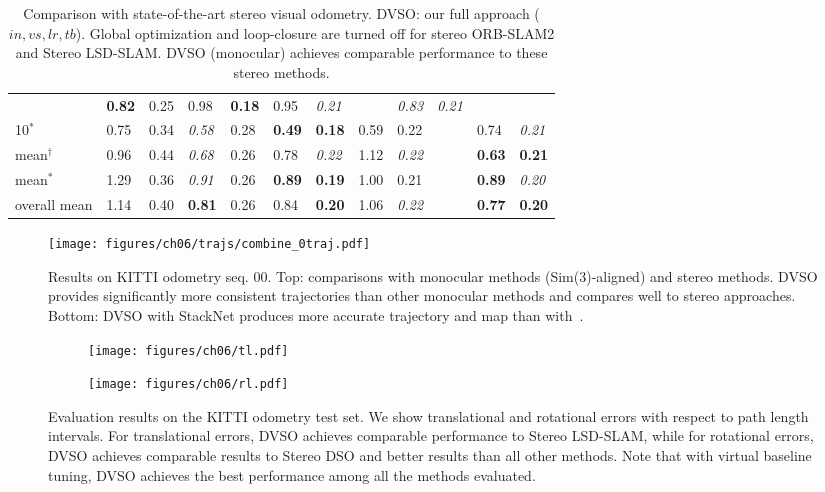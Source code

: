\documentclass[runningheads]{llncs}
\begin{document}
\begin{table}[tb]
\begin{tabular}{C{1.5cm}|C{0.9cm}C{0.9cm}|C{0.95cm}C{0.95cm}|C{0.75cm}C{0.75cm}|C{0.75cm}C{0.75cm}|C{2pt}|C{0.8cm}C{0.8cm}}
		& \textbf{0.82} & 0.25 & 0.98 & \textbf{0.18} 
		&0.95&\textit{0.21}&&\textit{0.83} & 
		\textit{0.21}\\
		10$^\ast$  & 0.75 & 0.34 
		& \textit{0.58} & 0.28 & \textbf{0.49} & \textbf{0.18} 
		&0.59&0.22&&0.74 & 
		\textit{0.21}\\
		\hline
		\hline
		mean$^\dagger$ & 0.96 & 0.44& \textit{0.68} & 0.26 &0.78 & 
		\textit{0.22} & 
		1.12&\textit{0.22}&&\textbf{0.63} & \textbf{0.21}\\
		mean$^\ast$ & 1.29 & 0.36& \textit{0.91} & 0.26 &\textbf{0.89} & 
		\textbf{0.19} & 
		1.00&0.21&&\textbf{0.89} & \textit{0.20}\\
		overall mean & 1.14 & 0.40& \textbf{0.81} & 0.26 &0.84 & 
		\textbf{0.20} & 
		1.06&\textit{0.22}&&\textbf{0.77} & \textbf{0.20}\\
	\end{tabular}
	
	\caption{Comparison with state-of-the-art stereo visual odometry. 
		DVSO: our full approach ($in,vs,lr,tb$). Global optimization and loop-closure are turned off for 
		stereo ORB-SLAM2 and Stereo LSD-SLAM. DVSO (monocular) achieves comparable 
		performance to 
		these 
		stereo methods.}
	\label{tab:compare_other_stereo}
\end{table}\begin{SCfigure}
	\centering
		\texttt{[image: figures/ch06/trajs/combine\_0traj.pdf]}
	\caption{Results on KITTI odometry seq. 00. Top: 
		comparisons with monocular methods (Sim(3)-aligned) and stereo methods. 
		DVSO provides significantly more consistent 
		trajectories than other monocular methods and compares well to 
		stereo approaches. Bottom: DVSO with StackNet produces more accurate 
		trajectory and map than with~\cite{godard2016unsupervised}. }
	\label{fig:kitti_traj}
\end{SCfigure}\begin{figure}[tb]
	\centering
	\begin{subfigure}[t]{.49\textwidth}
		\centering
		\texttt{[image: figures/ch06/tl.pdf]}
	\end{subfigure}
	\begin{subfigure}[t]{.49\textwidth}
		\centering
		\texttt{[image: figures/ch06/rl.pdf]}
	\end{subfigure}
	\caption{Evaluation results on the KITTI odometry test set. 
		We show translational and rotational errors with respect to 
		path length intervals. For translational errors, DVSO achieves 
		comparable performance to Stereo LSD-SLAM, while for rotational errors, DVSO 
		achieves comparable results to Stereo DSO 
		and better results than all other methods. Note that with virtual baseline 
		tuning, DVSO achieves the best performance among all the 
		methods evaluated.}
	\label{fig:kitti_test_set}
\end{figure}
\end{document}

